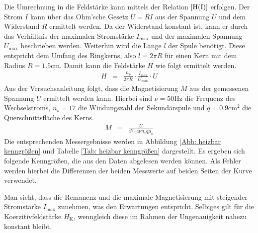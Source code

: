 \documentclass[12pt,a4paper]{scrartcl}
\numberwithin{equation}{section} %
\newcommand{\pu}[1]{\ensuremath{\mathrm{#1}}}
\renewcommand{\[}{} %
\renewcommand{\]}{\noindent} %
\begin{document}
Die Umrechnung in die Feldstärke kann mittels der Relation \(\eqref{H(I)}\) erfolgen. Der Strom \(I\) kann über das Ohm'sche Gesetz \(U=RI\) aus der Spannung \(U\) und dem Widerstand \(R\) ermittelt werden. Da der Widerstand konstant ist, kann er durch das Verhältnis der maximalen Stromstärke \(I_\mathrm{max}\) und der maximalen Spannung \(U_\mathrm{max}\) beschrieben werden. Weiterhin wird die Länge \(l\) der Spule benötigt. Diese entspricht dem Umfang des Ringkerns, also \(l=2\pi R\) für einen Kern mit dem Radius \(R=1.5\mathrm{cm}\). Damit kann die Feldstärke \(H\) wie folgt ermittelt werden.
\begin{eqnarray}
    H &=&
        \frac{n_p}{2\pi R} \cdot \frac{I_\mathrm{max}}{U_\mathrm{max}} \cdot U
        \label{H}
\end{eqnarray}
Aus der Versuchsanleitung \cite{Uni} folgt, dass die Magnetisierung \(M\) aus der gemessenen Spannung \(U\) ermittelt werden kann. Hierbei sind \(\nu=\pu{50 Hz}\) die Frequenz des Wechselstroms, \(n_s=17\) die Windungszahl der Sekundärspule und \(q = \pu{0.9 cm^2}\) die
Querschnittsfläche des Kerns.
\begin{eqnarray}
    M &=&
        \frac{U}{47\cdot 4\nu n_s q \mu_0}
        \label{M}
\end{eqnarray}
Die entsprechenden Messergebnisse werden in Abbildung \ref{Abb: heizbar kenngrößen} und Tabelle \ref{Tab: heizbar kenngrößen} dargestellt. Es ergeben sich folgende Kenngrößen, die aus den Daten abgelesen werden können. Als Fehler werden hierbei die Differenzen der beiden Messwerte auf beiden Seiten der Kurve verwendet.

Man sieht, dass die Remanenz und die maximale Magnetisierung mit
steigender Stromstärke \(I_\mathrm{max}\) zunehmen, was den Erwartungen
entspricht. Selbiges gilt für die Koerzitivfeldstärke \(H_\mathrm{K}\),
wenngleich diese im Rahmen der Ungenauigkeit nahezu konstant bleibt.
\end{document}
